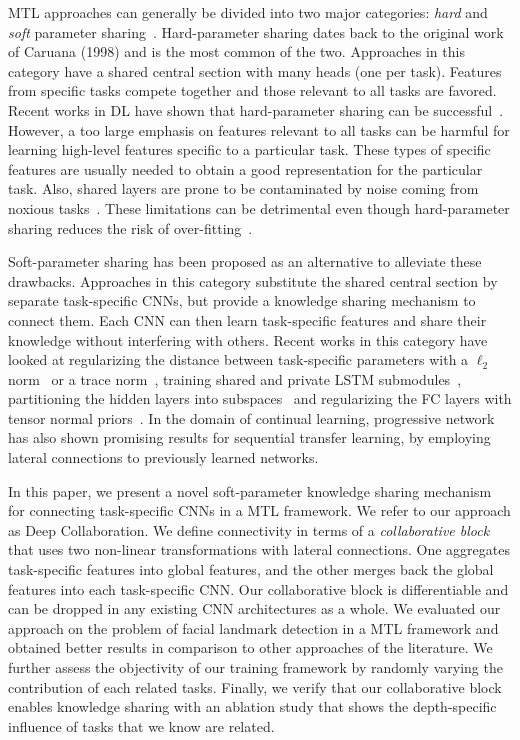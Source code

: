 \documentclass[runningheads]{llncs}
\newcommand{\citep}{\cite}
\begin{document}
MTL approaches can generally be divided into two major categories: \emph{hard} and \emph{soft} parameter sharing~\citep{DBLP:journals/corr/Ruder17a}. Hard-parameter sharing dates back to the original work of Caruana (1998) and is the most common of the two. Approaches in this category have a shared central section with many heads (one per task). Features from specific tasks compete together and those relevant to all tasks are favored. Recent works in DL have shown that hard-parameter sharing can be successful~\citep{ranjan2016hyperface}\citep{zhang2014facial}\citep{pinto2017learning}\citep{yin2017multi}. However, a too large emphasis on features relevant to all tasks can be harmful for learning high-level features specific to a particular task. These types of specific features are usually needed to obtain a good representation for the particular task. Also, shared layers are prone to be contaminated by noise coming from noxious tasks~\citep{liu2017adversarial}. These limitations can be detrimental even though hard-parameter sharing reduces the risk of over-fitting~\citep{baxter1997bayesian}.


Soft-parameter sharing has been proposed as an alternative to alleviate these drawbacks. Approaches in this category substitute the shared central section by separate task-specific CNNs, but provide a knowledge sharing mechanism to connect them. Each CNN can then learn task-specific features and share their knowledge without interfering with others. Recent works in this category have looked at regularizing the distance between task-specific parameters with a $\ell_2$ norm~\citep{duong2015low} or a trace norm~\citep{yang2016trace}, training shared and private LSTM submodules~\citep{liu2017adversarial}, partitioning the hidden layers into subspaces~\citep{ruder2017sluice} and regularizing the FC layers with tensor normal priors~\citep{long2015learning}. In the domain of continual learning, progressive network~\citep{rusu2016progressive} has also shown promising results for sequential transfer learning, by employing lateral connections to previously learned networks.

In this paper, we present a novel soft-parameter knowledge sharing mechanism for connecting task-specific CNNs in a MTL framework. We refer to our approach as Deep Collaboration. We define connectivity in terms of a \textit{collaborative block} that uses two non-linear transformations with lateral connections. One aggregates task-specific features into global features, and the other merges back the global features into each task-specific CNN. Our collaborative block is differentiable and can be dropped in any existing CNN architectures as a whole. We evaluated our approach on the problem of facial landmark detection in a MTL framework and obtained better results in comparison to other approaches of the literature. We further assess the objectivity of our training framework by randomly varying the contribution of each related tasks. Finally, we verify that our collaborative block enables knowledge sharing with an ablation study that shows the depth-specific influence of tasks that we know are related.
\end{document}
